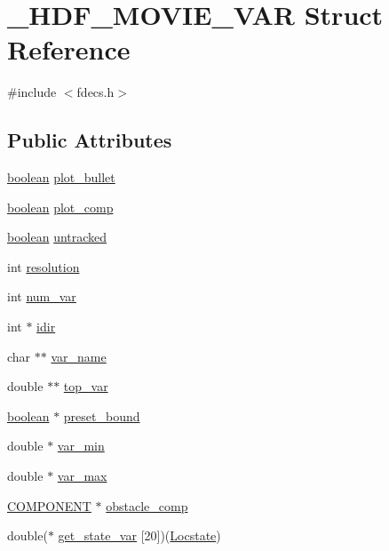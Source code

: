 \hypertarget{struct___h_d_f___m_o_v_i_e___v_a_r}{}\section{\+\_\+\+H\+D\+F\+\_\+\+M\+O\+V\+I\+E\+\_\+\+V\+AR Struct Reference}
\label{struct___h_d_f___m_o_v_i_e___v_a_r}


{\ttfamily \#include $<$fdecs.\+h$>$}

\subsection*{Public Attributes}
\begin{DoxyCompactItemize}
\item 
\hyperlink{cdecs_8h_ad048433382a936258fb49e2ec4f148e1}{boolean} \hyperlink{struct___h_d_f___m_o_v_i_e___v_a_r_a94b81c498faf4fb0e24bfc8a67d16b3e}{plot\+\_\+bullet}
\item 
\hyperlink{cdecs_8h_ad048433382a936258fb49e2ec4f148e1}{boolean} \hyperlink{struct___h_d_f___m_o_v_i_e___v_a_r_a9d5e04bac3abd1bd8996f42b7aae639b}{plot\+\_\+comp}
\item 
\hyperlink{cdecs_8h_ad048433382a936258fb49e2ec4f148e1}{boolean} \hyperlink{struct___h_d_f___m_o_v_i_e___v_a_r_a76588d2ff952235137751e75aa35246e}{untracked}
\item 
int \hyperlink{struct___h_d_f___m_o_v_i_e___v_a_r_a8b65ffcc7479d36889323091c0fb4ee0}{resolution}
\item 
int \hyperlink{struct___h_d_f___m_o_v_i_e___v_a_r_a50da42e6b9c5c527a54c8ffae5e50ba2}{num\+\_\+var}
\item 
int $\ast$ \hyperlink{struct___h_d_f___m_o_v_i_e___v_a_r_a33e2401008ac7a87ba9dcc422721dba7}{idir}
\item 
char $\ast$$\ast$ \hyperlink{struct___h_d_f___m_o_v_i_e___v_a_r_abe74fa810598e7ce778df19894a93f9e}{var\+\_\+name}
\item 
double $\ast$$\ast$ \hyperlink{struct___h_d_f___m_o_v_i_e___v_a_r_a51f7e7714b1bf4ebc5d6dc9099a90bb7}{top\+\_\+var}
\item 
\hyperlink{cdecs_8h_ad048433382a936258fb49e2ec4f148e1}{boolean} $\ast$ \hyperlink{struct___h_d_f___m_o_v_i_e___v_a_r_a40e0ba8708b3f887037b3b25e10a5aa2}{preset\+\_\+bound}
\item 
double $\ast$ \hyperlink{struct___h_d_f___m_o_v_i_e___v_a_r_a7c283f201602d07f61252252d6715070}{var\+\_\+min}
\item 
double $\ast$ \hyperlink{struct___h_d_f___m_o_v_i_e___v_a_r_af14b7876bbf0bd5f8ff0057188fbabaf}{var\+\_\+max}
\item 
\hyperlink{int_8h_a2bb7be12ca59ea6443c8757df0a7c278}{C\+O\+M\+P\+O\+N\+E\+NT} $\ast$ \hyperlink{struct___h_d_f___m_o_v_i_e___v_a_r_a64982b912e0b0ba2656592f156e5f0bb}{obstacle\+\_\+comp}
\item 
double($\ast$ \hyperlink{struct___h_d_f___m_o_v_i_e___v_a_r_ad931949499301521a7cb7a3fb3d46a19}{get\+\_\+state\+\_\+var} \mbox{[}20\mbox{]})(\hyperlink{fdecs_8h_ace3c795e1cf7a6b6e5444944f0b59bcd}{Locstate})
\end{DoxyCompactItemize}


